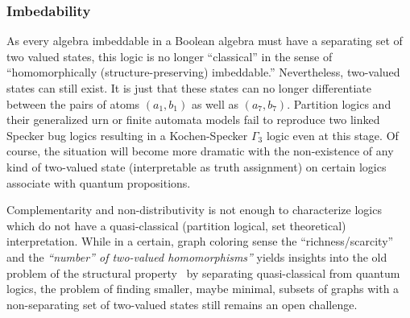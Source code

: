 \subsubsection*{Imbedability}

As every algebra imbeddable in a Boolean algebra must have a separating set of two valued states,
this logic is no longer ``classical''
in the sense of ``homomorphically (structure-preserving) imbeddable.''
Nevertheless, two-valued states can still exist. It is just that these states can no longer differentiate
between the pairs of atoms $(a_1,b_1)$ as well as $(a_7,b_7)$.
Partition logics and their generalized urn or finite automata models fail to reproduce
two linked Specker bug logics resulting in a Kochen-Specker $\Gamma_3$ logic even at this stage.
Of course, the situation will become more dramatic with the non-existence of any kind of two-valued state
(interpretable as truth assignment) on certain logics associate with quantum propositions.

Complementarity and non-distributivity is not enough to characterize logics which do not have a quasi-classical
(partition logical, set theoretical) interpretation.
While in a certain, graph coloring sense the ``richness/scarcity'' and the {\em ``number''
of two-valued homomorphisms''} yields insights into the old problem of the structural property~\cite{Cooke-1983}
by
separating quasi-classical from quantum logics,
the problem of finding smaller, maybe minimal,
subsets of graphs with a non-separating set of two-valued states  still remains an open challenge.

